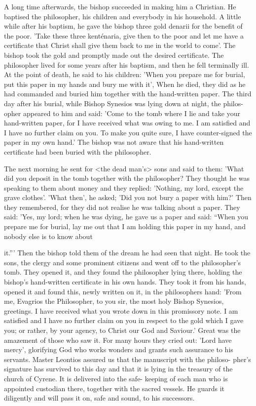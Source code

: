 A long time afterwards, the bishop succeeded in making him a
Christian.
He baptised the philosopher, his children and everybody
in his household.
A little while after his baptism, he gave the bishop
three gold denarii for the benefit of the poor.
'Take these three
kenténaria, give then to the poor and let me have a certificate that
Christ shall give them back to me in the world to come'.
The bishop
took the gold and promptly made out the desired certificate.
The
philosopher lived for some years after his baptism, and then he fell
terminally ill.
At the point of death, he said to his children: 'When
you prepare me for burial, put this paper in my hands and bury me
with it', When he died, they did as he had commanded and buried
him together with the hand-written paper.
The third day after his
burial, while Bishop Synesios was lying down at night, the philos-
opher appeared to him and said: 'Come to the tomb where I lie and
take your hand-written paper, for I have received what was owing
to me.
I am satisfied and I have no further claim on you.
To make
you quite sure, I have counter-signed the paper in my own hand.'
The bishop was not aware that his hand-written certificate had been
buried with the philosopher.

The next morning he sent for <the dead man's> sons and said
to them: 'What did you deposit in the tomb together with the
philosopher? They thought he was speaking to them about money
and they replied: 'Nothing, my lord, except the grave clothes'.
'What
then', he asked; 'Did you not bury a paper with him?' Then they
remembered, for they did not realise he was talking about a paper.
They said: 'Yes, my lord; when he was dying, he gave us a paper
and said: “When you prepare me for burial, lay me out that I am
holding this paper in my hand, and nobody else is to know about

it.”' Then the bishop told them of the dream he had seen that night.
He took the sons, the clergy and some prominent citizens and went
off to the philosopher's tomb.
They opened it, and they found the
philosopher lying there, holding the bishop's hand-written certificate
in his own hands.
They took it from his hands, opened it and found
this, newly written on it, in the philosopher\textquotesingle s hand: 'From me,
Evagrios the Philosopher, to you sir, the most holy Bishop Synesios,
greetings.
I have received what you wrote down in this promissory
note.
I am satisfied and I have no further claim on you in respect
to the gold which I gave you; or rather, by your agency, to Christ
our God and Saviour.' Great was the amazement of those who saw
it.
For many hours they cried out: 'Lord have mercy', glorifying
God who works wonders and grants such assurance to his servants.
Master Leontios assured us that the manuscript with the philoso-
pher's signature has survived to this day and that it is lying in the
treasury of the church of Cyrene.
It is delivered into the safe-
keeping of each man who is appointed custodian there, together
with the sacred vessels.
He guards it diligently and will pass it on,
safe and sound, to his successors.

